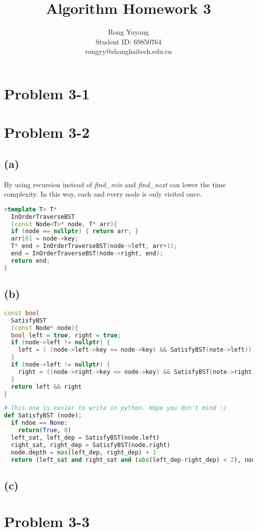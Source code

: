 \documentclass{article}
\title{Algorithm Homework 3}
\author{Rong Yuyang \\ Student ID: 69850764 \\ rongyy@shanghaitech.edu.cn}
\begin{document}
\maketitle

\section*{Problem 3-1}
\section*{Problem 3-2}
    \subsection*{(a)}
    By using recursion instead of \textit{find\_min} and \textit{find\_next} can lower the time complexity. In this way, each and every node is only visited once.
\begin{lstlisting}[language = C++]
<template T> T*
  InOrderTraverseBST
  (const Node<T>* node, T* arr){
  if (node == nullptr) { return arr; }
  arr[0] = node->key;
  T* end = InOrderTraverseBST(node->left, arr+1);
  end = InOrderTraverseBST(node->right, end);
  return end;
}
\end{lstlisting}   

    \subsection*{(b)}
\begin{lstlisting}[language = C++]
const bool
  SatisfyBST 
  (const Node* node){
  bool left = true, right = true;
  if (node->left != nullptr) {
    left = ( (node->left->key <= node->key) && SatisfyBST(note->left))
  } 
  if (node->left != nullptr) {
    right = ((node->right->key <= node->key) && SatisfyBST(note->right))
  } 
  return left && right
}
\end{lstlisting}   
\begin{lstlisting}[language = python]
# This one is easier to write in python. Hope you don't mind :)
def SatisfyBST (node):
  if ndoe == None:
    return(True, 0)
  left_sat, left_dep = SatisfyBST(node.left)
  right_sat, right_dep = SatisfyBST(node.right)
  node.depth = max(left_dep, right_dep) + 1
  return (left_sat and right_sat and (abs(left_dep-right_dep) < 2), node.depth)

\end{lstlisting}   
    \subsection*{(c)}
\section*{Problem 3-3}
\end{document}
